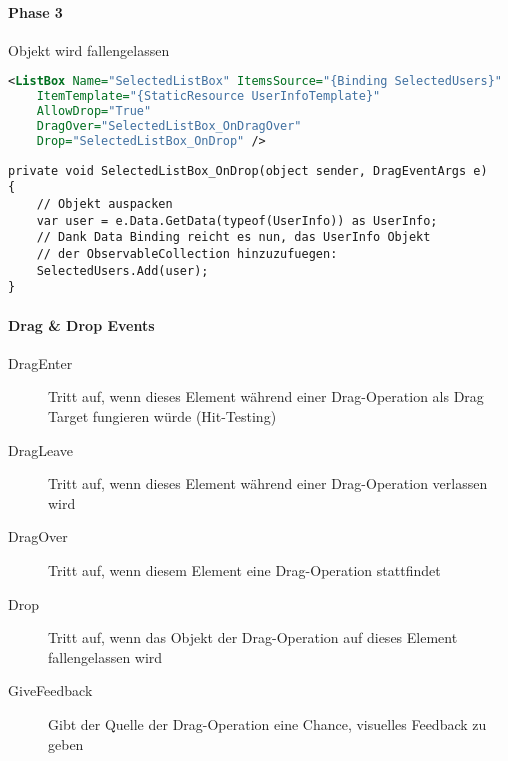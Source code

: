 \paragraph{Phase 3} Objekt wird fallengelassen
\begin{lstlisting}[language=xml]
<ListBox Name="SelectedListBox" ItemsSource="{Binding SelectedUsers}"
    ItemTemplate="{StaticResource UserInfoTemplate}"
    AllowDrop="True"
    DragOver="SelectedListBox_OnDragOver"
    Drop="SelectedListBox_OnDrop" />
\end{lstlisting}
\begin{lstlisting}
private void SelectedListBox_OnDrop(object sender, DragEventArgs e)
{
    // Objekt auspacken
    var user = e.Data.GetData(typeof(UserInfo)) as UserInfo;
    // Dank Data Binding reicht es nun, das UserInfo Objekt
    // der ObservableCollection hinzuzufuegen:
    SelectedUsers.Add(user);
}
\end{lstlisting}
\paragraph{Drag \& Drop Events}
\begin{description}
\item[DragEnter] Tritt auf, wenn dieses Element während einer Drag-Operation als Drag Target fungieren würde (Hit-Testing)
\item[DragLeave] Tritt auf, wenn dieses Element während einer Drag-Operation verlassen wird
\item[DragOver] Tritt auf, wenn diesem Element eine Drag-Operation stattfindet
\item[Drop] Tritt auf, wenn das Objekt der Drag-Operation auf dieses Element fallengelassen wird
\item[GiveFeedback] Gibt der Quelle der Drag-Operation eine Chance, visuelles Feedback zu geben
\end{description}

